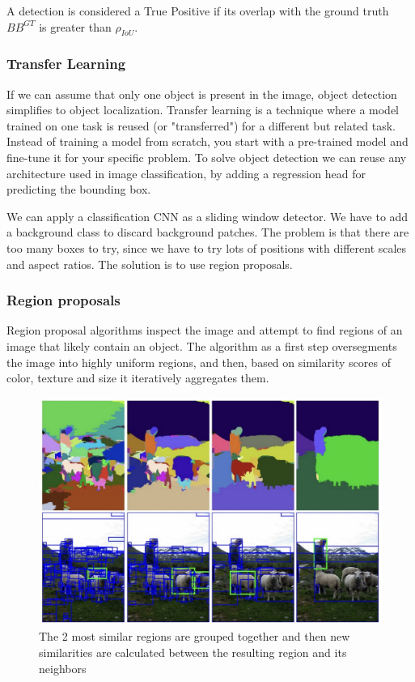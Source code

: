 A detection is considered a True Positive if its overlap with the ground truth $BB^{GT}$ is greater than $\rho_{IoU}$.

\subsubsection{Transfer Learning}
If we can assume that only one object is present in the image, object detection simplifies to object localization.
Transfer learning is a technique where a model trained on one task is reused (or "transferred") for a different but related task.
Instead of training a model from scratch, you start with a pre-trained model and fine-tune it for your specific problem.
To solve object detection we can reuse any architecture used in image classification, by adding a regression head for predicting the bounding box.

We can apply a classification CNN as a sliding window detector.
We have to add a background class to discard background patches.
The problem is that there are too many boxes to try, since we have to try lots of positions with different scales and aspect ratios.
The solution is to use region proposals.

\subsubsection{Region proposals}
Region proposal algorithms inspect the image and attempt to find regions of an image that likely contain an object.
The algorithm as a first step oversegments the image into highly uniform regions, and then, based on similarity scores of color, texture and size it iteratively aggregates them.

\begin{figure}[htbp]
  \centering
  \includegraphics[width=0.6\linewidth]{./img/region_proposal.jpg}
  \caption{The 2 most similar regions are grouped together and then new similarities are calculated between the resulting region and its neighbors}
\end{figure}

